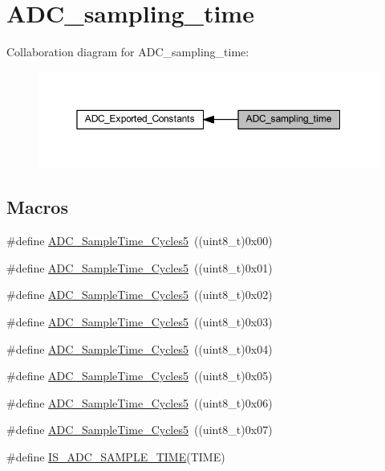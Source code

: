 \hypertarget{group___a_d_c__sampling__time}{}\section{A\+D\+C\+\_\+sampling\+\_\+time}
\label{group___a_d_c__sampling__time}
Collaboration diagram for A\+D\+C\+\_\+sampling\+\_\+time\+:
\nopagebreak
\begin{figure}[H]
\begin{center}
\leavevmode
\includegraphics[width=350pt]{group___a_d_c__sampling__time}
\end{center}
\end{figure}
\subsection*{Macros}
\begin{DoxyCompactItemize}
\item 
\#define \hyperlink{group___a_d_c__sampling__time_gad085065e48857ada890863a7db575c6e}{A\+D\+C\+\_\+\+Sample\+Time\+\_\+Cycles5}~((uint8\+\_\+t)0x00)
\item 
\#define \hyperlink{group___a_d_c__sampling__time_gac4101073619c4d79efa28a477696b3f5}{A\+D\+C\+\_\+\+Sample\+Time\+\_\+Cycles5}~((uint8\+\_\+t)0x01)
\item 
\#define \hyperlink{group___a_d_c__sampling__time_gaef37e223e826ac5e6ee5ef30881f9b27}{A\+D\+C\+\_\+\+Sample\+Time\+\_\+Cycles5}~((uint8\+\_\+t)0x02)
\item 
\#define \hyperlink{group___a_d_c__sampling__time_ga6251e64783f7a6562e17e71f7edd68d8}{A\+D\+C\+\_\+\+Sample\+Time\+\_\+Cycles5}~((uint8\+\_\+t)0x03)
\item 
\#define \hyperlink{group___a_d_c__sampling__time_gadc3d26f9bf5fa6589889cc938c66e0e7}{A\+D\+C\+\_\+\+Sample\+Time\+\_\+Cycles5}~((uint8\+\_\+t)0x04)
\item 
\#define \hyperlink{group___a_d_c__sampling__time_ga6a6fbbadc0e35a719fb749bf6b0704d6}{A\+D\+C\+\_\+\+Sample\+Time\+\_\+Cycles5}~((uint8\+\_\+t)0x05)
\item 
\#define \hyperlink{group___a_d_c__sampling__time_gae46e8978ac3160969156739ddb867dae}{A\+D\+C\+\_\+\+Sample\+Time\+\_\+Cycles5}~((uint8\+\_\+t)0x06)
\item 
\#define \hyperlink{group___a_d_c__sampling__time_ga93117dc4090dc4e3e84e0eef6d6ab073}{A\+D\+C\+\_\+\+Sample\+Time\+\_\+Cycles5}~((uint8\+\_\+t)0x07)
\item 
\#define \hyperlink{group___a_d_c__sampling__time_ga30e0307fa009e1c383d3047b48e94644}{I\+S\+\_\+\+A\+D\+C\+\_\+\+S\+A\+M\+P\+L\+E\+\_\+\+T\+I\+ME}(T\+I\+ME)
\end{DoxyCompactItemize}


